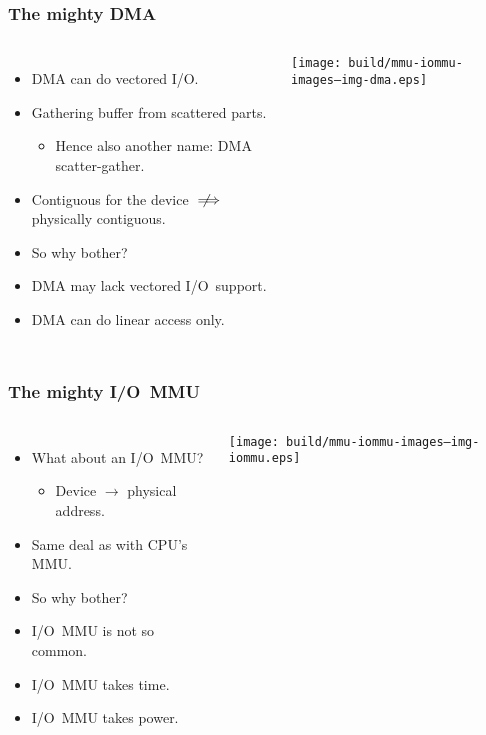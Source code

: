 \begin{frame}
  \frametitle{The mighty DMA}

  \begin{columns}[c]

    \begin{itemize}
    \item DMA can do vectored I/O.
    \item Gathering buffer from scattered parts.
      \begin{itemize}
        \item {\footnotesize Hence also another name: DMA scatter-gather.}
      \end{itemize}
    \item Contiguous for the device $\notimplies$ physically contiguous.
    \item<1> So why bother?
    \item<2> DMA may lack vectored I/O~support.
    \item<2> DMA can do linear access only.
    \end{itemize}

    \begin{center}
      \texttt{[image: build/mmu-iommu-images--img-dma.eps]}
    \end{center}

  \end{columns}
\end{frame}

\begin{frame}
  \frametitle{The mighty I/O~MMU}

  \begin{columns}[c]

    \begin{itemize}
    \item What about an I/O~MMU?
      \begin{itemize}
      \item Device $\rightarrow$ physical address.
      \end{itemize}
    \item Same deal as with CPU's MMU.
    \item<1> So why bother?
    \item<2> I/O~MMU is not so common.
    \item<2> I/O~MMU takes time.
    \item<2> I/O~MMU takes power.
    \end{itemize}

    \begin{center}
      \texttt{[image: build/mmu-iommu-images--img-iommu.eps]}
    \end{center}

  \end{columns}
\end{frame}
